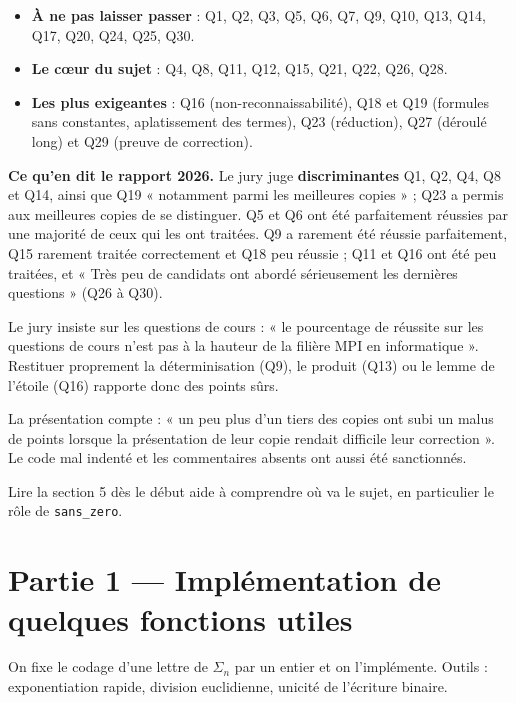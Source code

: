 \documentclass[11pt,a4paper]{article}
\providecommand{\tightlist}{\setlength{\itemsep}{0pt}\setlength{\parskip}{0pt}}
\begin{document}
\begin{itemize}
\tightlist
\item
  \textbf{À ne pas laisser passer} : Q1, Q2, Q3, Q5, Q6, Q7, Q9, Q10, Q13, Q14, Q17, Q20, Q24, Q25, Q30.
\item
  \textbf{Le cœur du sujet} : Q4, Q8, Q11, Q12, Q15, Q21, Q22, Q26, Q28.
\item
  \textbf{Les plus exigeantes} : Q16 (non-\allowbreak{}reconnaissabilité), Q18 et Q19 (formules sans constantes, aplatissement des termes), Q23 (réduction), Q27 (déroulé long) et Q29 (preuve de correction).
\end{itemize}

\textbf{Ce qu'en dit le rapport 2026.} Le jury juge \textbf{discriminantes} Q1, Q2, Q4, Q8 et Q14, ainsi que Q19 « notamment parmi les meilleures copies » ; Q23 a permis aux meilleures copies de se distinguer. Q5 et Q6 ont été parfaitement réussies par une majorité de ceux qui les ont traitées. Q9 a rarement été réussie parfaitement, Q15 rarement traitée correctement et Q18 peu réussie ; Q11 et Q16 ont été peu traitées, et « Très peu de candidats ont abordé sérieusement les dernières questions » (Q26 à Q30).

Le jury insiste sur les questions de cours : « le pourcentage de réussite sur les questions de cours n'est pas à la hauteur de la filière MPI en informatique ». Restituer proprement la déterminisation (Q9), le produit (Q13) ou le lemme de l'étoile (Q16) rapporte donc des points sûrs.

La présentation compte : « un peu plus d'un tiers des copies ont subi un malus de points lorsque la présentation de leur copie rendait difficile leur correction ». Le code mal indenté et les commentaires absents ont aussi été sanctionnés.

Lire la section 5 dès le début aide à comprendre où va le sujet, en particulier le rôle de \texttt{sans\_zero}.

\hypertarget{partie-1-impluxe9mentation-de-quelques-fonctions-utiles}{%
\section{Partie 1 --- Implémentation de quelques fonctions utiles}\label{partie-1-impluxe9mentation-de-quelques-fonctions-utiles}}

On fixe le codage d'une lettre de \(\Sigma_n\) par un entier et on l'implémente. Outils : exponentiation rapide, division euclidienne, unicité de l'écriture binaire.
\end{document}
